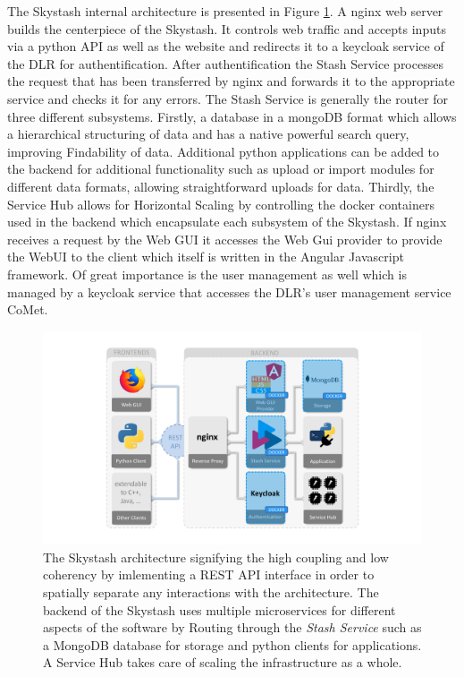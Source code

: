 The Skystash internal architecture is presented in Figure \ref{fig:skystash_architecture}. A nginx web server builds the centerpiece of the Skystash. It controls web traffic and accepts inputs via a python API as well as the website and redirects it to a keycloak service of the DLR for authentification. After authentification the Stash Service processes the request that has been transferred by nginx and forwards it to the appropriate service and checks it for any errors. The Stash Service is generally the router for three different subsystems. Firstly, a database in a mongoDB format which allows a hierarchical structuring of data and has a native powerful search query, improving Findability of data. Additional python applications can be added to the backend for additional functionality such as upload or import modules for different data formats, allowing straightforward uploads for data. Thirdly, the Service Hub allows for Horizontal Scaling by controlling the docker containers used in the backend which encapsulate each subsystem of the Skystash. If nginx receives a request by the Web GUI it accesses the Web Gui provider to provide the WebUI to the client which itself is written in the Angular Javascript framework. Of great importance is the user management as well which is managed by a keycloak service that accesses the DLR's user management service CoMet.

\begin{figure}[h]
    \centering
    \includegraphics[width=\textwidth]{03_figures/stash_architecture}
    \caption[The Skystash architecture \cite{arts_digital_2022}]{The Skystash architecture signifying the high coupling and low coherency by imlementing a REST API interface in order to spatially separate any interactions with the architecture. The backend of the Skystash uses multiple microservices for different aspects of the software by Routing through the \textit{Stash Service} such as a MongoDB database for storage and python clients for applications. A Service Hub takes care of scaling the infrastructure as a whole. \cite{arts_digital_2022}}
    \label{fig:skystash_architecture}
\end{figure}

